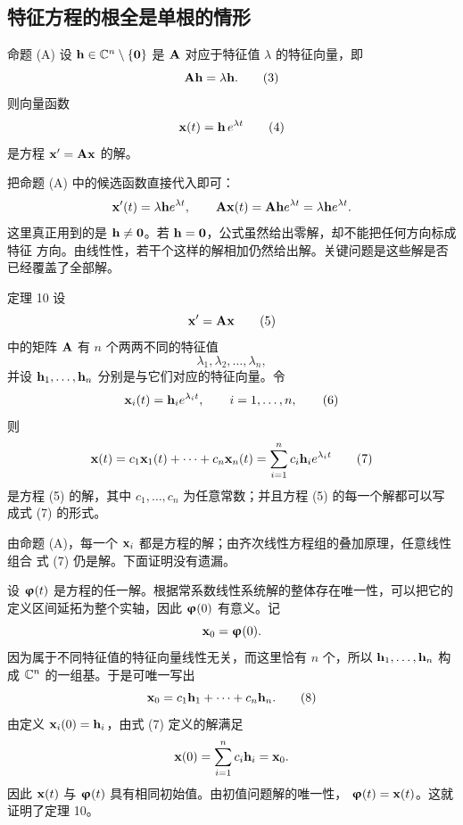 \subsection*{特征方程的根全是单根的情形}

\begin{sourceitem}{命题 (A)}
设 \(\vect{h}\in\C^n\setminus\{\vect{0}\}\) 是 \(\mathbf{A}\) 对应于特征值 \(\lambda\) 的特征向量，即
\begin{equation}
 \mat{A}\vect{h}=\lambda \vect{h}.
 \tag{3}
\end{equation}
则向量函数
\begin{equation}
 \vect{x}(t)=\vect{h}\,e^{\lambda t}
 \tag{4}
\end{equation}
是方程 \(\vect{x}'=\mat{A}\vect{x}\) 的解。
\end{sourceitem}

把命题 (A) 中的候选函数直接代入即可：
\[
 \vect{x}'(t)=\lambda \vect{h} e^{\lambda t},\qquad
 \mat{A}\vect{x}(t)=\mat{A} \vect{h} e^{\lambda t}=\lambda \vect{h} e^{\lambda t}.
\]
这里真正用到的是 \(\vect{h}\neq\vect{0}\)。若 \(\vect{h}=\vect{0}\)，公式虽然给出零解，却不能把任何方向标成特征
方向。由线性性，若干个这样的解相加仍然给出解。关键问题是这些解是否已经覆盖了全部解。

\begin{sourceitem}{定理 10}
设
\begin{equation}
 \vect{x}'=\mat{A}\vect{x}
 \tag{5}
\end{equation}
中的矩阵 \(\mathbf{A}\) 有 \(n\) 个两两不同的特征值
\[
 \lambda_1,\lambda_2,\ldots,\lambda_n,
\]
并设 \(\vect{h}_1,\ldots,\vect{h}_n\) 分别是与它们对应的特征向量。令
\begin{equation}
 \vect{x}_i(t)=\vect{h}_i e^{\lambda_i t},\qquad i=1,\ldots,n,
 \tag{6}
\end{equation}
则
\begin{equation}
 \vect{x}(t)=c_1\vect{x}_1(t)+\cdots+c_n\vect{x}_n(t)
   =\sum_{i=1}^{n}c_i \vect{h}_i e^{\lambda_i t}
 \tag{7}
\end{equation}
是方程 (5) 的解，其中 \(c_1,\ldots,c_n\) 为任意常数；并且方程
(5) 的每一个解都可以写成式 (7) 的形式。
\end{sourceitem}

由命题 (A)，每一个 \(\vect{x}_i\) 都是方程的解；由齐次线性方程组的叠加原理，任意线性组合
式 (7) 仍是解。下面证明没有遗漏。

设 \(\vect{\varphi}(t)\) 是方程的任一解。根据常系数线性系统解的整体存在唯一性，可以把它的
定义区间延拓为整个实轴，因此 \(\vect{\varphi}(0)\) 有意义。记
\[
 \vect{x}_0=\vect{\varphi}(0).
\]
因为属于不同特征值的特征向量线性无关，而这里恰有 \(n\) 个，所以
\(\vect{h}_1,\ldots,\vect{h}_n\) 构成 \(\mathbb C^n\) 的一组基。于是可唯一写出
\begin{equation}
 \vect{x}_0=c_1\vect{h}_1+\cdots+c_n\vect{h}_n.
 \tag{8}
\end{equation}
由定义 \(\vect{x}_i(0)=\vect{h}_i\)，由式 (7) 定义的解满足
\[
 \vect{x}(0)=\sum_{i=1}^{n}c_i\vect{h}_i=\vect{x}_0.
\]
因此 \(\vect{x}(t)\) 与 \(\vect{\varphi}(t)\) 具有相同初始值。由初值问题解的唯一性，
\(\vect{\varphi}(t)=\vect{x}(t)\)。这就证明了定理 10。

